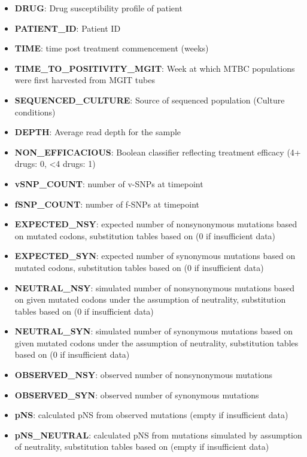 \documentclass[12pt, oneside]{article}   	%
\begin{document}
\begin{itemize}
\item \textbf{DRUG}: Drug susceptibility profile of patient
\item \textbf{PATIENT\_ID}: Patient ID
\item \textbf{TIME}: time post treatment commencement (weeks)
\item \textbf{TIME\_TO\_POSITIVITY\_MGIT}: Week at which MTBC populations were first harvested from MGIT tubes
\item \textbf{SEQUENCED\_CULTURE}: Source of sequenced population (Culture conditions)
\item \textbf{DEPTH}: Average read depth for the sample
\item \textbf{NON\_EFFICACIOUS}: Boolean classifier reflecting treatment efficacy (4+ drugs: 0, <4 drugs: 1)
\item \textbf{vSNP\_COUNT}:  number of v-SNPs at timepoint
\item \textbf{fSNP\_COUNT}:  number of f-SNPs at timepoint
\item \textbf{EXPECTED\_NSY}:  expected number of nonsynonymous mutations based on mutated codons, substitution tables based on \cite{HKY1985} (0 if insufficient data)
\item \textbf{EXPECTED\_SYN}:  expected number of synonymous mutations based on mutated codons, substitution tables based on \cite{HKY1985} (0 if insufficient data)
\item \textbf{NEUTRAL\_NSY}:  simulated number of nonsynonymous mutations based on given mutated codons under the assumption of neutrality, substitution tables based on \cite{HKY1985} (0 if insufficient data)
\item \textbf{NEUTRAL\_SYN}:  simulated number of synonymous mutations based on given mutated codons under the assumption of neutrality, substitution tables based on \cite{HKY1985} (0 if insufficient data)
\item \textbf{OBSERVED\_NSY}:  observed number of nonsynonymous mutations
\item \textbf{OBSERVED\_SYN}:  observed number of synonymous mutations
\item \textbf{pNS}:  calculated pNS from observed mutations (empty if insufficient data)
\item \textbf{pNS\_NEUTRAL}:  calculated pNS from mutations simulated by assumption of neutrality, substitution tables based on \cite{HKY1985} (empty if insufficient data)
\end{itemize}
\end{document}
